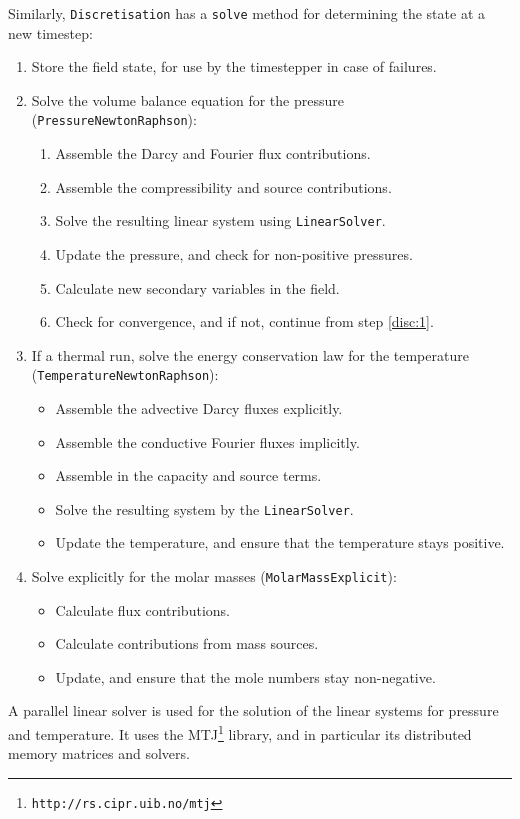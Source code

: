 Similarly, \texttt{Discretisation} has a \texttt{solve} method for
determining the state at a new timestep:
\begin{enumerate}
\item Store the field state, for use by the timestepper in case of
  failures.
\item Solve the volume balance equation for the pressure
  (\texttt{PressureNewtonRaphson}):
  \begin{enumerate}
  \item\label{disc:1} Assemble the Darcy and Fourier flux contributions.
  \item Assemble the compressibility and source contributions.
  \item Solve the resulting linear system using \texttt{LinearSolver}.
  \item Update the pressure, and check for non-positive pressures.
  \item Calculate new secondary variables in the field.
  \item Check for convergence, and if not, continue from step
    \ref{disc:1}.
  \end{enumerate}
\item If a thermal run, solve the energy conservation law for the
  temperature (\texttt{TemperatureNewtonRaphson}):
  \begin{itemize}
  \item Assemble the advective Darcy fluxes explicitly.
  \item Assemble the conductive Fourier fluxes implicitly.
  \item Assemble in the capacity and source terms.
  \item Solve the resulting system by the \texttt{LinearSolver}.
  \item Update the temperature, and ensure that the temperature stays
    positive.
  \end{itemize}
\item Solve explicitly for the molar masses
  (\texttt{MolarMassExplicit}):
  \begin{itemize}
  \item Calculate flux contributions.
  \item Calculate contributions from mass sources.
  \item Update, and ensure that the mole numbers stay non-negative.
  \end{itemize}
\end{enumerate}



A parallel linear solver is used for the solution of the linear
systems for pressure and temperature. It uses the
MTJ\footnote{\texttt{http://rs.cipr.uib.no/mtj}} library, and in
particular its distributed memory matrices and solvers.

